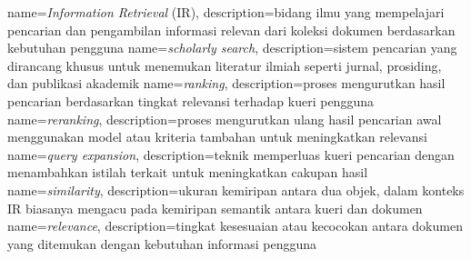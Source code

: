 {
	name={\textit{Information Retrieval} (IR)},
	description={bidang ilmu yang mempelajari pencarian dan pengambilan informasi relevan dari koleksi dokumen berdasarkan kebutuhan pengguna}
}
{
	name={\textit{scholarly search}},
	description={sistem pencarian yang dirancang khusus untuk menemukan literatur ilmiah seperti jurnal, prosiding, dan publikasi akademik}
}
{
	name={\textit{ranking}},
	description={proses mengurutkan hasil pencarian berdasarkan tingkat relevansi terhadap kueri pengguna}
}
{
	name={\textit{reranking}},
	description={proses mengurutkan ulang hasil pencarian awal menggunakan model atau kriteria tambahan untuk meningkatkan relevansi}
}
{
	name={\textit{query expansion}},
	description={teknik memperluas kueri pencarian dengan menambahkan istilah terkait untuk meningkatkan cakupan hasil}
}
{
	name={\textit{similarity}},
	description={ukuran kemiripan antara dua objek, dalam konteks IR biasanya mengacu pada kemiripan semantik antara kueri dan dokumen}
}
{
	name={\textit{relevance}},
	description={tingkat kesesuaian atau kecocokan antara dokumen yang ditemukan dengan kebutuhan informasi pengguna}
}

